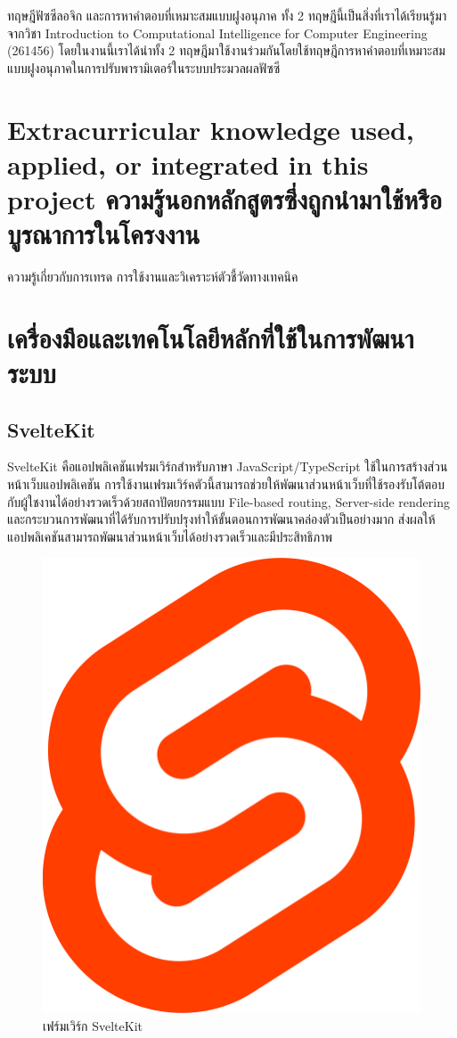 ทฤษฎีฟัซซีลอจิก และการหาคำตอบที่เหมาะสมแบบฝูงอนุภาค ทั้ง 2 ทฤษฎีนี้เป็นสิ่งที่เราได้เรียนรู้มาจากวิชา Introduction to Computational Intelligence for Computer Engineering (261456) โดยในงานนี้เราได้นำทั้ง 2 ทฤษฎีมาใช้งานร่วมกันโดยใช้ทฤษฎีการหาคำตอบที่เหมาะสมแบบฝูงอนุภาคในการปรับพารามิเตอร์ในระบบประมวลผลฟัซซี

\section{\ifenglish%
Extracurricular knowledge used, applied, or integrated in this project
\else%
ความรู้นอกหลักสูตรซึ่งถูกนำมาใช้หรือบูรณาการในโครงงาน
\fi
}

ความรู้เกี่ยวกับการเทรด การใช้งานและวิเคราะห์ตัวชี้วัดทางเทคนิค

\section{เครื่องมือและเทคโนโลยีหลักที่ใช้ในการพัฒนาระบบ}
\subsection{SvelteKit}
SvelteKit คือแอปพลิเคชันเฟรมเวิร์กสำหรับภาษา JavaScript/TypeScript ใช้ในการสร้างส่วนหน้าเว็บแอปพลิเคชัน การใช้งานเฟรมเวิร์คตัวนี้สามารถช่วยให้พัฒนาส่วนหน้าเว็บที่ใช้รองรับโต้ตอบกับผู้ใชงานได้อย่างรวดเร็วด้วยสถาปัตยกรรมแบบ File-based routing, Server-side rendering และกระบวนการพัฒนาที่ได้รับการปรับปรุงทำให้ขั้นตอนการพัฒนาคล่องตัวเป็นอย่างมาก ส่งผลให้แอปพลิเคชันสามารถพัฒนาส่วนหน้าเว็บได้อย่างรวดเร็วและมีประสิทธิภาพ
\begin{figure}[ht]
  \centering
  \includegraphics[scale=0.025]{images/tech/sveltekit.png}
  \caption{เฟร์มเวิร์ก SvelteKit}
  \label{fig:sveltekit}
\end{figure}
\FloatBarrier

